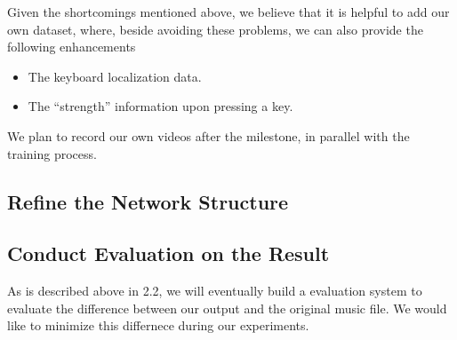 \documentclass[10pt,twocolumn,letterpaper]{article}
\begin{document}
Given the shortcomings mentioned above, we believe that it is helpful to add our own dataset, where, beside avoiding these problems, we can also provide the following enhancements

\begin{itemize}
  \item The keyboard localization data.
  \item The ``strength'' information upon pressing a key.
\end{itemize}

We plan to record our own videos after the milestone, in parallel with the training process.

\subsection{Refine the Network Structure}

\subsection{Conduct Evaluation on the Result}

As is described above in 2.2, we will eventually build a evaluation system to evaluate the difference between our output and the original music file. We would like to minimize this differnece during our experiments.

{\small


}
\end{document}
